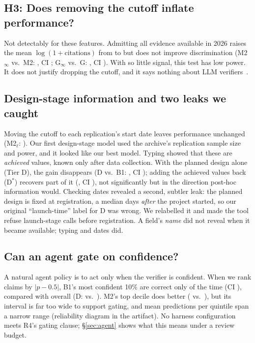 \documentclass[conference]{IEEEtran}
\begin{document}
\subsection{H3: Does removing the cutoff inflate performance?}
Not detectably for these features. Admitting all evidence available in 2026 raises the mean $\log(1+\text{citations})$ from \logCitesStrict{} to \logCitesLeaky{} but does not improve discrimination (M2$_\infty$ vs.\ M2: \dLeakMtwo{}, CI \dciLeakMtwo{}; G$_\infty$ vs.\ G: \dLeakG{}, CI \dciLeakG{}). With so little signal, this test has low power. It does not justify dropping the cutoff, and it says nothing about LLM verifiers~\cite{sainz2023}.

\subsection{Design-stage information and two leaks we caught}
Moving the cutoff to each replication's start date leaves performance unchanged (M2$_\ell$: \aucMtwolaunch{}). Our first design-stage model used the archive's replication sample size and power, and it looked like our best model. Typing showed that these are \emph{achieved} values, known only after data collection. With the planned design alone (Tier D), the gain disappears (D vs.\ B1: \dDplanBone{}, CI \dciDplanBone{}); adding the achieved values back (D$^{*}$) recovers part of it (\dDachDplan{}, CI \dciDachDplan{}), not significantly but in the direction post-hoc information would. Checking dates revealed a second, subtler leak: the planned design is fixed at registration, a median \regLagDays{} days \emph{after} the project started, so our original ``launch-time'' label for D was wrong. We relabelled it and made the tool refuse launch-stage calls before registration. A field's \emph{name} did not reveal when it became available; typing and dates did.


\subsection{Can an agent gate on confidence?}\label{sec:selective}
A natural agent policy is to act only when the verifier is confident. When we rank claims by $|p-0.5|$, B1's most confident 10\% are correct only \selTopBone{} of the time (CI \selTopCIBone{}), compared with \selAllBone{} overall (D: \selTopDplan{} vs.\ \selAllDplan{}). M2's top decile does better (\selTopMtwo{} vs.\ \selAllMtwo{}), but its interval \selTopCIMtwo{} is far too wide to support gating, and mean predictions per quintile span a narrow range (reliability diagram in the artifact). No harness configuration meets R4's gating clause; \S\ref{sec:agent} shows what this means under a review budget.
\end{document}
